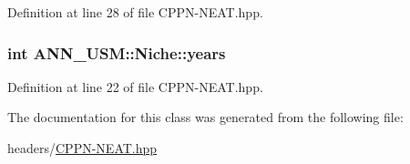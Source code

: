 Definition at line 28 of file C\-P\-P\-N-\/\-N\-E\-A\-T.\-hpp.

\hypertarget{class_a_n_n___u_s_m_1_1_niche_a60d2ec0e62180968e1f93e1c8751a593}{
\subsubsection[{years}]{\setlength{\rightskip}{0pt plus 5cm}int A\-N\-N\-\_\-\-U\-S\-M\-::\-Niche\-::years}}\label{class_a_n_n___u_s_m_1_1_niche_a60d2ec0e62180968e1f93e1c8751a593}


Definition at line 22 of file C\-P\-P\-N-\/\-N\-E\-A\-T.\-hpp.



The documentation for this class was generated from the following file\-:\begin{DoxyCompactItemize}
\item 
headers/\hyperlink{_c_p_p_n-_n_e_a_t_8hpp}{C\-P\-P\-N-\/\-N\-E\-A\-T.\-hpp}\end{DoxyCompactItemize}
